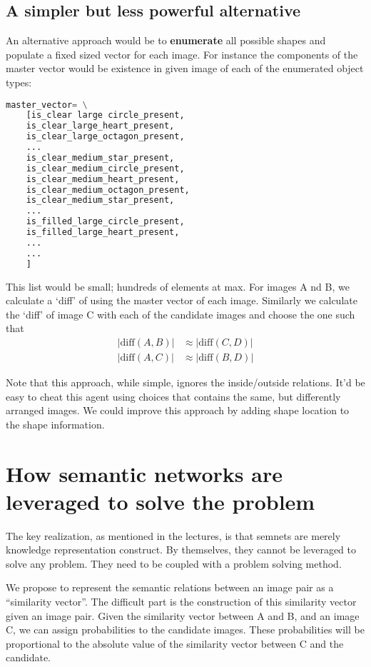 \documentclass[10pt,letterpaper]{article}
\begin{document}
\subsection {A simpler but less powerful  alternative}
An alternative approach would be to {\bf enumerate} all possible shapes and populate a fixed sized vector for each image. For instance the components of the master vector would be existence in given image of each of the enumerated object types:
\begin{small}
\begin{lstlisting}[language=python]
master_vector= \
	[is_clear large circle_present, 
	is_clear_large_heart_present, 
	is_clear_large_octagon_present, 
	...
	is_clear_medium_star_present,
	is_clear_medium_circle_present, 
	is_clear_medium_heart_present, 
	is_clear_medium_octagon_present, 
	is_clear_medium_star_present, 
	...
	is_filled_large_circle_present,
	is_filled_large_heart_present,
	...
	...
	] 
\end{lstlisting}
\end{small}
This list would be small; hundreds of elements at max. For images A nd B, we calculate a `diff' of using the master vector of each image. Similarly we calculate the `diff' of image C with each of the candidate images and choose the one such that 
\begin{align*}
\vert\text{diff}(A, B)\vert &\approx \vert\text{diff}(C, D)\vert \\
\vert\text{diff}(A, C)\vert &\approx \vert\text{diff}(B, D)\vert
\end{align*} 

Note that this approach, while simple, ignores the inside/outside relations. It'd be easy to cheat this agent using choices that contains the same, but differently arranged images. We could improve this approach by adding shape location to the shape information. 
\section{How semantic networks are leveraged to solve the problem}
The key realization, as mentioned in the lectures, is that semnets are merely knowledge representation construct. By themselves, they cannot be leveraged to solve any problem. They need to be coupled with a problem solving method. 

We propose to represent the semantic relations between an image pair as a ``similarity vector''. The difficult part is the construction of this similarity vector given an image pair. Given the similarity vector between A and B, and an image C, we can assign probabilities to the candidate images. These probabilities will be proportional to the absolute value of the similarity vector between C and the candidate. 
\end{document}
